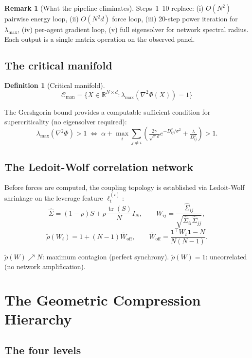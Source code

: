 \documentclass[11pt,a4paper]{article}
\theoremstyle{definition}
\newtheorem{definition}[theorem]{Definition}
\newtheorem{remark}[theorem]{Remark}
\newcommand{\R}{\mathbb{R}}
\begin{document}
\begin{remark}[What the pipeline eliminates]
Steps~1--10 replace: (i) $O(N^2)$ pairwise energy loop, (ii) $O(N^2d)$ force loop,
(iii) 20-step power iteration for $\lambda_\mathrm{max}$, (iv) per-agent gradient loop,
(v) full eigensolver for network spectral radius.
Each output is a single matrix operation on the observed panel.
\end{remark}

\subsection{The critical manifold}

\begin{definition}[Critical manifold]
\[
\mathcal{C}_\mathrm{man} = \{X\in\R^{N\times d} : \lambda_\mathrm{max}(\nabla^2\Phi(X)) = 1\}
\]
\end{definition}

The Gershgorin bound provides a computable sufficient condition for supercriticality
(no eigensolver required):
\[
\lambda_\mathrm{max}(\nabla^2\Phi) > 1
\;\iff\;
\alpha + \max_i\sum_{j\neq i}\!\left(\tfrac{2\gamma}{\sqrt\pi\sigma}e^{-D_{ij}^2/\sigma^2}
+ \tfrac{\lambda}{D_{ij}^2}\right) > 1.
\]

\subsection{The Ledoit-Wolf correlation network}

Before forces are computed, the coupling topology is established via Ledoit-Wolf
shrinkage on the leverage feature $\ell_t^{(i)}$:
\[
\hat\Sigma = (1-\rho)S + \rho\frac{\operatorname{tr}(S)}{N}I_N, \qquad
W_{ij} = \frac{\hat\Sigma_{ij}}{\sqrt{\hat\Sigma_{ii}\hat\Sigma_{jj}}},
\]
\[
\tilde\rho(W_t) = 1 + (N-1)\bar W_\mathrm{off},\qquad
\bar W_\mathrm{off} = \frac{\mathbf{1}^\top W_t\mathbf{1}-N}{N(N-1)}.
\]

$\tilde\rho(W)\nearrow N$: maximum contagion (perfect synchrony).
$\tilde\rho(W)=1$: uncorrelated (no network amplification).

\section{The Geometric Compression Hierarchy}
\label{sec:compression}

\subsection{The four levels}
\end{document}
